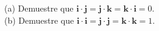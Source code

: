 \item (a) Demuestre que $\mathbf{i} \cdot \mathbf{j} = \mathbf{j} \cdot \mathbf{k} = \mathbf{k} \cdot \mathbf{i} = 0$. \\
          (b) Demuestre que $\mathbf{i} \cdot \mathbf{i} = \mathbf{j} \cdot \mathbf{j} = \mathbf{k} \cdot \mathbf{k} = 1$.
